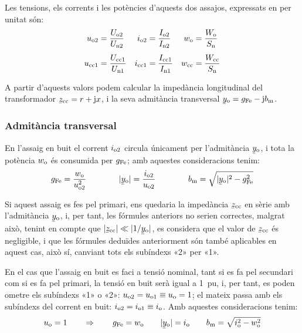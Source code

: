 Les tensions, els corrents i les potències d'aquests dos  assajos,
expressats en per unitat són:
\begin{align}
    u_\mathrm{o2} &=\frac{U_\mathrm{o2}}{U_\mathrm{n2}} &
    i_\mathrm{o2} &=\frac{I_\mathrm{o2}}{I_\mathrm{n2}} &
    w_\mathrm{o}  &=\frac{W_\mathrm{o}}{S_\mathrm{n}} \\[1ex]
    u_\mathrm{cc1} &=\frac{U_\mathrm{cc1}}{U_\mathrm{n1}} &
    i_\mathrm{cc1} &=\frac{I_\mathrm{cc1}}{I_\mathrm{n1}} &
    w_\mathrm{cc} &=\frac{W_\mathrm{cc}}{S_\mathrm{n}}
\end{align}

A partir d'aquests valors podem calcular la impedància longitudinal
del transformador $\cmplx{z}\ped{cc}=r+\ju x$, i la seva admitància
transversal $\cmplx{y}\ped{o}=g\ped{Fe}-\ju b\ped{m}$.

\subsubsection{Admitància transversal}

En l'assaig en buit el corrent $i_\mathrm{o2}$ circula
únicament per l'admitància $\cmplx{y}\ped{o}$, i tota la potència
$w_\mathrm{o}$ és consumida per $g_\mathrm{Fe}$; amb aquestes consideracions
tenim:
\begin{equation}
    g\ped{Fe} = \frac{w\ped{o}}{u\ped{o2}^2} \qquad\qquad
    |\cmplx{y}\ped{o}| = \frac{i\ped{o2}}{u\ped{o2}}
    \qquad\qquad
    b\ped{m} = \sqrt{|\cmplx{y}\ped{o}|^2 - g\ped{Fe}^2}
\end{equation}

Si aquest assaig es fes pel primari, ens quedaria la impedància
$\cmplx{z}\ped{cc}$ en sèrie amb l'admitància $\cmplx{y}\ped{o}$, i, per tant, les fórmules anteriors no serien correctes, malgrat això,
tenint en compte que $|\cmplx{z}\ped{cc}| \ll |1/\cmplx{y}\ped{o}|$,
es  considera que el valor de $\cmplx{z}\ped{cc}$ és negligible, i
que les fórmules deduïdes anteriorment són també aplicables en
aquest cas, això sí, canviant tots els subíndexs «2» per «1».

En el cas que l'assaig en buit es faci a tensió nominal, tant  si es
fa pel secundari com si es fa pel primari, la tensió en buit serà
igual a \qty{1}{pu}, i, per tant, es poden ometre els subíndexs «1» o «2»:
$u_\mathrm{o2} = u_\mathrm{o1} \equiv u_\mathrm{o} = 1$; el mateix passa amb els
subíndexs del corrent en buit: $i_\mathrm{o2} = i_\mathrm{o1} \equiv
i_\mathrm{o}$. Amb aquestes consideracions tenim:
\begin{equation}
    u\ped{o} = 1 \qquad \Rightarrow \qquad g\ped{Fe} = w\ped{o} \qquad
    |\cmplx{y}\ped{o}| = i\ped{o} \qquad
    b\ped{m} = \sqrt{i\ped{o}^2 - w\ped{o}^2}
    \label{eq:assaig-buit-nomianl}
\end{equation}

